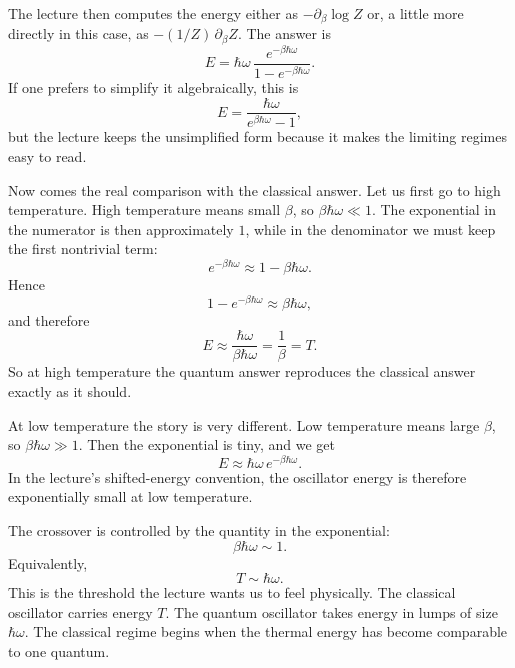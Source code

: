 The lecture then computes the energy either as \(-\partial_\beta\log Z\) or, a little more directly in this case, as \(-(1/Z)\,\partial_\beta Z\). The answer is
\begin{equation}
E=\hbar\omega\,\frac{e^{-\beta\hbar\omega}}{1-e^{-\beta\hbar\omega}}.
\end{equation}
If one prefers to simplify it algebraically, this is
\begin{equation}
E=\frac{\hbar\omega}{e^{\beta\hbar\omega}-1},
\end{equation}
but the lecture keeps the unsimplified form because it makes the limiting regimes easy to read.

Now comes the real comparison with the classical answer. Let us first go to high temperature. High temperature means small \(\beta\), so \(\beta\hbar\omega\ll 1\). The exponential in the numerator is then approximately \(1\), while in the denominator we must keep the first nontrivial term:
\begin{equation}
e^{-\beta\hbar\omega}\approx 1-\beta\hbar\omega.
\end{equation}
Hence
\begin{equation}
1-e^{-\beta\hbar\omega}\approx \beta\hbar\omega,
\end{equation}
and therefore
\begin{equation}
E\approx \frac{\hbar\omega}{\beta\hbar\omega}=\frac{1}{\beta}=T.
\end{equation}
So at high temperature the quantum answer reproduces the classical answer exactly as it should.

At low temperature the story is very different. Low temperature means large \(\beta\), so \(\beta\hbar\omega\gg 1\). Then the exponential is tiny, and we get
\begin{equation}
E\approx \hbar\omega\,e^{-\beta\hbar\omega}.
\end{equation}
In the lecture's shifted-energy convention, the oscillator energy is therefore exponentially small at low temperature.

The crossover is controlled by the quantity in the exponential:
\begin{equation}
\beta\hbar\omega\sim 1.
\end{equation}
Equivalently,
\begin{equation}
T\sim \hbar\omega.
\end{equation}
This is the threshold the lecture wants us to feel physically. The classical oscillator carries energy \(T\). The quantum oscillator takes energy in lumps of size \(\hbar\omega\). The classical regime begins when the thermal energy has become comparable to one quantum.

